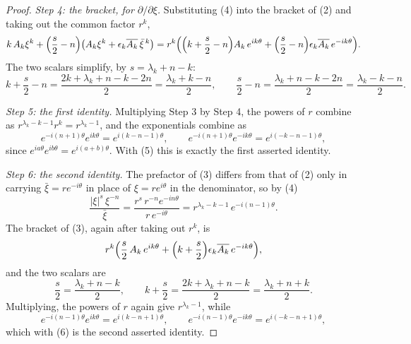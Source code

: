 \begin{proof}
\emph{Step 4: the bracket, for $\partial/\partial\xi$.}  Substituting (4) into
the bracket of (2) and taking out the common factor $r^{k}$,
\[
  k\,A_k\xi^{k}
   +\Bigl(\frac{s}{2}-n\Bigr)
     \bigl(A_k\xi^{k}+\epsilon_k\overline{A_k}\,\bar\xi^{\,k}\bigr)
  =r^{k}\Bigl(\Bigl(k+\frac{s}{2}-n\Bigr)A_k\,e^{ik\theta}
     +\Bigl(\frac{s}{2}-n\Bigr)\epsilon_k\overline{A_k}\,e^{-ik\theta}\Bigr).
\]
The two scalars simplify, by $s=\lambda_k+n-k$:
\begin{equation}\tag{5}
  k+\frac{s}{2}-n=\frac{2k+\lambda_k+n-k-2n}{2}=\frac{\lambda_k+k-n}{2},
  \qquad
  \frac{s}{2}-n=\frac{\lambda_k+n-k-2n}{2}=\frac{\lambda_k-k-n}{2}.
\end{equation}

\emph{Step 5: the first identity.}  Multiplying Step 3 by Step 4, the powers of
$r$ combine as $r^{\lambda_k-k-1}r^{k}=r^{\lambda_k-1}$, and the exponentials
combine as
\[
  e^{-i(n+1)\theta}e^{ik\theta}=e^{i(k-n-1)\theta},
  \qquad
  e^{-i(n+1)\theta}e^{-ik\theta}=e^{i(-k-n-1)\theta},
\]
since $e^{ia\theta}e^{ib\theta}=e^{i(a+b)\theta}$.  With (5) this is exactly
the first asserted identity.

\emph{Step 6: the second identity.}  The prefactor of (3) differs from that of
(2) only in carrying $\bar\xi=re^{-i\theta}$ in place of $\xi=re^{i\theta}$ in
the denominator, so by (4)
\[
  \frac{|\xi|^{s}\,\xi^{-n}}{\bar\xi}
  =\frac{r^{s}\,r^{-n}e^{-in\theta}}{r\,e^{-i\theta}}
  =r^{\lambda_k-k-1}\,e^{-i(n-1)\theta}.
\]
The bracket of (3), again after taking out $r^{k}$, is
\[
  r^{k}\Bigl(\frac{s}{2}\,A_k\,e^{ik\theta}
    +\Bigl(k+\frac{s}{2}\Bigr)\epsilon_k\overline{A_k}\,e^{-ik\theta}\Bigr),
\]
and the two scalars are
\begin{equation}\tag{6}
  \frac{s}{2}=\frac{\lambda_k+n-k}{2},
  \qquad
  k+\frac{s}{2}=\frac{2k+\lambda_k+n-k}{2}=\frac{\lambda_k+n+k}{2}.
\end{equation}
Multiplying, the powers of $r$ again give $r^{\lambda_k-1}$, while
\[
  e^{-i(n-1)\theta}e^{ik\theta}=e^{i(k-n+1)\theta},
  \qquad
  e^{-i(n-1)\theta}e^{-ik\theta}=e^{i(-k-n+1)\theta},
\]
which with (6) is the second asserted identity.
\end{proof}
